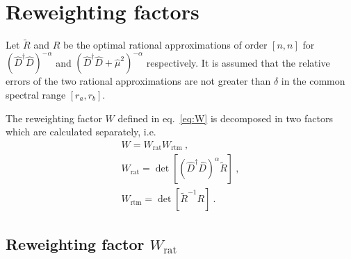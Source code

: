 \documentclass[11pt,fleqn]{article}
\newcommand{\Rmu}{R}
\newcommand{\R}{\tilde{R}}
\begin{document}
\section{Reweighting factors}

Let $\R$ and $\Rmu$ be the optimal rational approximations of order $[n,n]$ for $(\hat{D}^\dag \hat{D})^{-\alpha}$ and $(\hat{D}^\dag \hat{D} + \hat{\mu}^2)^{-\alpha}$ respectively. It is assumed that the relative errors of the two rational approximations are not greater than $\delta$ in the common spectral range $[r_a,r_b]$.

The reweighting factor $W$ defined in eq.~\eqref{eq:W} is decomposed in two factors which are calculated separately, i.e.
\begin{gather}
   W = W_\text{rat} W_\text{rtm} \ , \\
   W_\text{rat} = \det [ (\hat{D}^\dag \hat{D})^{\alpha} \R ] \ ,
   \label{eq:Wrat} \\
   W_\text{rtm} = \det [ \R^{-1} \Rmu ]
   \label{eq:Wtm} \ .
\end{gather}


\subsection{Reweighting factor $W_\text{rat}$}
\end{document}
